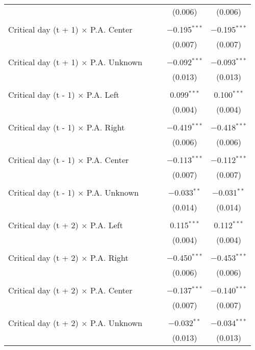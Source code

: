 \documentclass[
]{article}
\begin{document}
\begin{table}[!htbp]
{\begin{tabular}{@{\extracolsep{5pt}}lcccc}
  &  &  & (0.006) & (0.006) \\ 
  & & & & \\ 
 Critical day (t + 1) $\times$ P.A. Center &  &  & $-$0.195$^{***}$ & $-$0.195$^{***}$ \\ 
  &  &  & (0.007) & (0.007) \\ 
  & & & & \\ 
 Critical day (t + 1) $\times$ P.A. Unknown &  &  & $-$0.092$^{***}$ & $-$0.093$^{***}$ \\ 
  &  &  & (0.013) & (0.013) \\ 
  & & & & \\ 
 Critical day (t - 1) $\times$ P.A. Left &  &  & 0.099$^{***}$ & 0.100$^{***}$ \\ 
  &  &  & (0.004) & (0.004) \\ 
  & & & & \\ 
 Critical day (t - 1) $\times$ P.A. Right &  &  & $-$0.419$^{***}$ & $-$0.418$^{***}$ \\ 
  &  &  & (0.006) & (0.006) \\ 
  & & & & \\ 
 Critical day (t - 1) $\times$ P.A. Center &  &  & $-$0.113$^{***}$ & $-$0.112$^{***}$ \\ 
  &  &  & (0.007) & (0.007) \\ 
  & & & & \\ 
 Critical day (t - 1) $\times$ P.A. Unknown &  &  & $-$0.033$^{**}$ & $-$0.031$^{**}$ \\ 
  &  &  & (0.014) & (0.014) \\ 
  & & & & \\ 
 Critical day (t + 2) $\times$ P.A. Left &  &  & 0.115$^{***}$ & 0.112$^{***}$ \\ 
  &  &  & (0.004) & (0.004) \\ 
  & & & & \\ 
 Critical day (t + 2) $\times$ P.A. Right &  &  & $-$0.450$^{***}$ & $-$0.453$^{***}$ \\ 
  &  &  & (0.006) & (0.006) \\ 
  & & & & \\ 
 Critical day (t + 2) $\times$ P.A. Center &  &  & $-$0.137$^{***}$ & $-$0.140$^{***}$ \\ 
  &  &  & (0.007) & (0.007) \\ 
  & & & & \\ 
 Critical day (t + 2) $\times$ P.A. Unknown &  &  & $-$0.032$^{**}$ & $-$0.034$^{***}$ \\ 
  &  &  & (0.013) & (0.013) \\ 

\end{tabular}}
\end{table}
\end{document}
